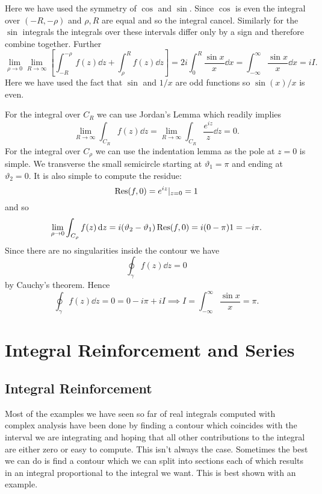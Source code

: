\documentclass{article}
\begin{document}
    Here we have used the symmetry of \(\cos\) and \(\sin\). Since \(\cos\) is even the integral over \((-R, -\rho)\) and \(\rho, R\) are equal and so the integral cancel.
    Similarly for the \(\sin\) integrals the integrals over these intervals differ only by a sign and therefore combine together.
    Further
    \[\lim_{\rho\to 0}\lim_{R\to\infty} \left[ \int_{-R}^{-\rho} f(z) \dd{z} + \int_{\rho}^{R} f(z) \dd{z} \right] = 2i\int_{0}^{R} \frac{\sin x}{x}\dd{x} = \int_{-\infty}^{\infty} \frac{\sin x}{x} \dd{x} = iI.\]
    Here we have used the fact that \(\sin\) and \(1/x\) are odd functions so \(\sin(x)/x\) is even.
    
    For the integral over \(C_R\) we can use Jordan's Lemma which readily implies
    \[\lim_{R\to\infty} \int_{C_R} f(z) \dd{z} = \lim_{R\to\infty} \int_{C_R} \frac{e^{iz}}{z} \dd{z} = 0.\]
    For the integral over \(C_\rho\) we can use the indentation lemma as the pole at \(z = 0\) is simple.
    We transverse the small semicircle starting at \(\vartheta_1 = \pi\) and ending at \(\vartheta_2 = 0\).
    It is also simple to compute the residue:
    \[\Res(f, 0) = e^{iz}|_{z = 0} = 1\]
    and so
    \[\lim_{\rho\to 0} \int_{C_\rho} f(z) \dd{z} = i(\vartheta_2 - \vartheta_1)\Res(f, 0) = i(0 - \pi)1 = -i\pi.\]
    Since there are no singularities inside the contour we have
    \[\oint_{\gamma} f(z) \dd{z} = 0\]
    by Cauchy's theorem.
    Hence
    \[\oint_{\gamma} f(z) \dd{z} = 0 = 0 - i\pi + iI \implies I = \int_{-\infty}^{\infty} \frac{\sin x}{x} = \pi.\]
    
    \section{Integral Reinforcement and Series}
    \subsection{Integral Reinforcement}
    Most of the examples we have seen so far of real integrals computed with complex analysis have been done by finding a contour which coincides with the interval we are integrating and hoping that all other contributions to the integral are either zero or easy to compute.
    This isn't always the case.
    Sometimes the best we can do is find a contour which we can split into sections each of which results in an integral proportional to the integral we want.
    This is best shown with an example.
    
\end{document}
